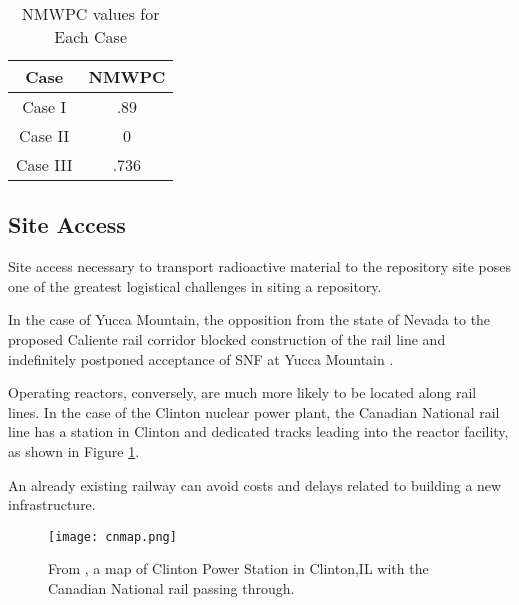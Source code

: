 \begin{table}[h]
	
	\centering
	\caption {\gls{NMWPC} values for Each Case}

		\begin{tabular}{|c|c|}
			\hline
			Case & NMWPC \\
			\hline
			Case I & .89\\
			Case II & 0\\
			Case III & .736 %
			\\
			\hline
                \end{tabular}
\end{table}


\subsection{Site Access}



Site access necessary to transport radioactive material to the repository site 
poses one of the greatest logistical challenges in siting a repository. 

In the case of Yucca Mountain, 
the opposition from the state of Nevada to the proposed Caliente rail corridor 
blocked construction of the rail line and indefinitely postponed
acceptance of \gls{SNF} at Yucca Mountain \cite{halstead_yucca_2011}.

Operating reactors, conversely, are much more likely to be located along rail 
lines. In the case of the Clinton nuclear power plant, 
the Canadian National rail line \cite{waleed_regional_2015} has a station in 
Clinton and dedicated tracks leading into the reactor facility, as shown in 
Figure \ref{fig:cnmap}.

An already existing railway can avoid costs and delays related to building a 
new infrastructure.

\begin{figure}[!h] 
  \centering
  \texttt{[image: cnmap.png]}	
        \caption{From \cite{canadian_national_railway_company_canadian_2016}, a map of Clinton Power Station in Clinton,IL
        with the Canadian National rail passing through.}
  \label{fig:cnmap}
\end{figure}

